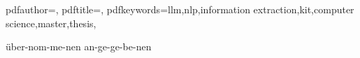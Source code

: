 \usepackage{xspace}
\newcommand{\ttime}{\texttt{time}\xspace}
\newcommand{\ttemp}{\texttt{temperature}\xspace}
\newcommand{\tadd}{\texttt{additive}\xspace}
\newcommand{\tsolv}{\texttt{solvent}\xspace}
\newcommand{\cid}{\texttt{cid}\xspace}

\newcommand*{\mybox}[2]{\colorbox{#1!10}{\parbox{.98\linewidth}{#2}}}

\setcounter{code}{0}
\newenvironment{codeboxed}[2]{
\begin{minipage}{\linewidth}\begin{center}\textbf{#1}\\\small \mybox{gray}{#2}\\[1ex]\begin{tabular}{|p{\textwidth}|}\hline}{
    \\\hline\end{tabular}\end{center}\end{minipage}}

\newcommand{\code}[3]{\refstepcounter{code}\label{code:#2}\begin{codeboxed}{Code Example \thecode}{#3}
        \inputminted[linenos,fontsize=\small]{Python}{code/#1}\end{codeboxed}}

\newcommand{\mpy}[1]{\texttt{#1}}

\hypersetup
{
    pdfauthor={\thesisauthor},
    pdftitle={\thesisentopic},
    pdfkeywords={llm,nlp,information extraction,kit,computer science,master,thesis,\thesisauthor}
}

\hyphenation
{
    über-nom-me-nen an-ge-ge-be-nen
}



